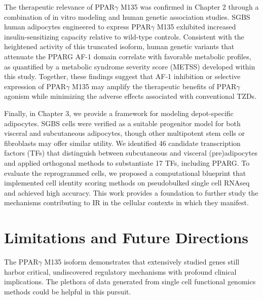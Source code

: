 \begin{dissertationepilogue}
    The therapeutic relevance of PPAR$\gamma$ M135 was confirmed in Chapter 2 through a combination of in vitro modeling and human genetic association studies. SGBS human adipocytes engineered to express PPAR$\gamma$ M135 exhibited increased insulin-sensitizing capacity relative to wild-type controls. Consistent with the heightened activity of this truncated isoform, human genetic variants that attenuate the PPARG AF-1 domain correlate with favorable metabolic profiles, as quantified by a metabolic syndrome severity score (METSS) developed within this study. Together, these findings suggest that AF-1 inhibition or selective expression of PPAR$\gamma$ M135 may amplify the therapeutic benefits of PPAR$\gamma$ agonism while minimizing the adverse effects associated with conventional TZDs.
    
    Finally, in Chapter 3, we provide a framework for modeling depot-specific adipocytes. SGBS cells were verified as a suitable progenitor model for both visceral and subcutaneous adipocytes, though other multipotent stem cells or fibroblasts may offer similar utility. We identified 46 candidate transcription factors (TFs) that distinguish between subcutaneous and visceral (pre)adipocytes and applied orthogonal methods to substantiate 17 TFs, including PPARG. To evaluate the reprogrammed cells, we proposed a computational blueprint that implemented cell identity scoring methods on pseudobulked single cell RNAseq and achieved high accuracy. This work provides a foundation to further study the mechanisms contributing to IR in the cellular contexts in which they manifest.

    \section{Limitations and Future Directions}

    The PPAR$\gamma$ M135 isoform demonstrates that extensively studied genes still harbor critical, undiscovered regulatory mechanisms with profound clinical implications. The plethora of data generated from single cell functional genomics methods could be helpful in this pursuit.
    

\end{dissertationepilogue}
